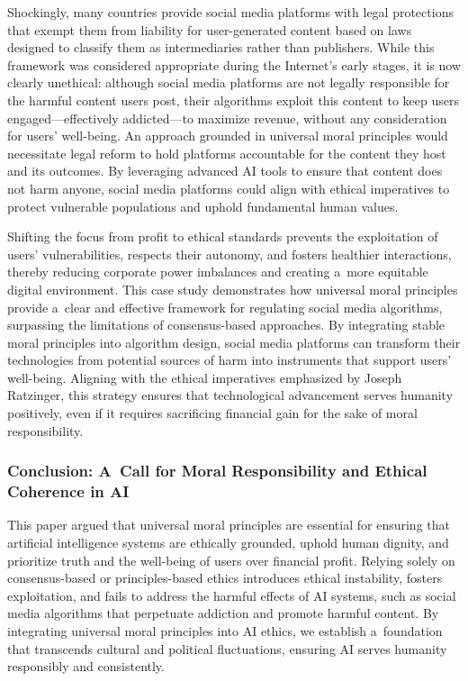 \documentclass[%
  manuscript=article,
  year=2024,
  volume=77,
  doi=00000.000,
]{zfn}
\begin{document}
Shockingly, many countries provide social media platforms with legal protections that exempt them from liability for user-generated content based on laws designed to classify them as intermediaries rather than publishers. While this framework was considered appropriate during the Internet's early stages, it is now clearly unethical: although social media platforms are not legally responsible for the harmful content users post, their algorithms exploit this content to keep users engaged---effectively addicted---to maximize revenue, without any consideration for users' well-being. An approach grounded in universal moral principles would necessitate legal reform to hold platforms accountable for the content they host and its outcomes. By leveraging advanced AI tools to ensure that content does not harm anyone, social media platforms could align with ethical imperatives to protect vulnerable populations and uphold fundamental human values.



Shifting the focus from profit to ethical standards prevents the exploitation of users' vulnerabilities, respects their autonomy, and fosters healthier interactions, thereby reducing corporate power imbalances and creating a~more equitable digital environment. This case study demonstrates how universal moral principles provide a~clear and effective framework for regulating social media algorithms, surpassing the limitations of consensus-based approaches. By integrating stable moral principles into algorithm design, social media platforms can transform their technologies from potential sources of harm into instruments that support users' well-being. Aligning with the ethical imperatives emphasized by Joseph Ratzinger, this strategy ensures that technological advancement serves humanity positively, even if it requires sacrificing financial gain for the sake of moral responsibility.



\subsubsection{Conclusion: A~Call for Moral Responsibility and Ethical Coherence in AI}



This paper argued that universal moral principles are essential for ensuring that artificial intelligence systems are ethically grounded, uphold human dignity, and prioritize truth and the well-being of users over financial profit. Relying solely on consensus-based or principles-based ethics introduces ethical instability, fosters exploitation, and fails to address the harmful effects of AI systems, such as social media algorithms that perpetuate addiction and promote harmful content. By integrating universal moral principles into AI ethics, we establish a~foundation that transcends cultural and political fluctuations, ensuring AI serves humanity responsibly and consistently.
\end{document}
